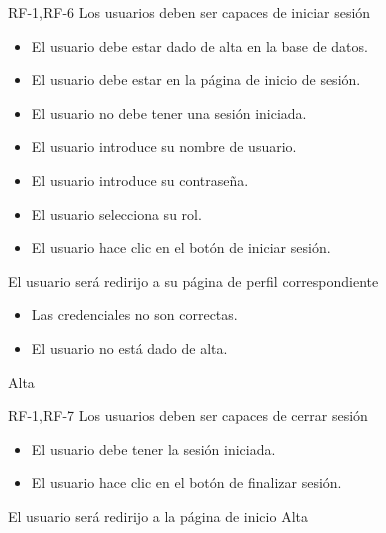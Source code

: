 {RF-1,RF-6}
{Los usuarios deben ser capaces de iniciar sesión}
{	\begin{itemize}
	\def\labelenumi{\arabic{enumi}.}
	\tightlist
	\item El usuario debe estar dado de alta en la base de datos.
	\item El usuario debe estar en la página de inicio de sesión.
	\item El usuario no debe tener una sesión iniciada.
	\end{itemize}}
{
	\begin{itemize}
	\def\labelenumi{\arabic{enumi}.}
	\tightlist

    \item El usuario introduce su nombre de usuario.
    \item El usuario introduce su contraseña.
    \item El usuario selecciona su rol.
    \item El usuario hace clic en el botón de iniciar sesión.
    \end{itemize}
}
{El usuario será redirijo a su página de perfil correspondiente}
{	\begin{itemize}
	\def\labelenumi{\arabic{enumi}.}
	\tightlist

    \item Las credenciales no son correctas.
    \item El usuario no está dado de alta.
    \end{itemize}}
{Alta}

{RF-1,RF-7}
{Los usuarios deben ser capaces de cerrar sesión}
{	\begin{itemize}
	\def\labelenumi{\arabic{enumi}.}
	\tightlist
	\item El usuario debe tener la sesión iniciada.
	\end{itemize}}
{
	\begin{itemize}
	\def\labelenumi{\arabic{enumi}.}
	\tightlist

    \item El usuario hace clic en el botón de finalizar sesión.
    \end{itemize}
}
{El usuario será redirijo a la página de inicio}
{}
{Alta}

